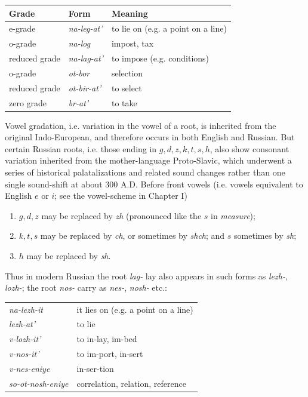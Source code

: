 \begin{center}
\begin{tabular}{@{}lll@{}}
\toprule
Grade & Form & Meaning\\
\midrule
e-grade & \emph{na-leg-at'} & to lie on (e.g. a point on a line)\\
o-grade & \emph{na-log} & impost, tax\\
reduced grade & \emph{na-lag-at'} & to impose (e.g. conditions)\\
o-grade & \emph{ot-bor} & selection\\
reduced grade & \emph{ot-bir-at'} & to select\\
zero grade & \emph{br-at'} & to take\\
\bottomrule
\end{tabular}
\end{center}


Vowel gradation, i.e. variation in the vowel of a root, is inherited from the original Indo-European, and therefore occurs in both English and Russian. But certain Russian roots, i.e. those ending in $g,d,z,k,t,s,h$, also show consonant variation inherited from the mother-language Proto-Slavic, which underwent a series of historical palatalizations and related sound changes rather than one single sound-shift at about 300 A.D. Before front vowels (i.e. vowels equivalent to English $e$ or $i$; see the vowel-scheme in Chapter I)

\begin{enumerate}[label=\roman*)]
\item $g,d,z$ may be replaced by \emph{zh} (pronounced like the $s$ in \emph{measure});
\item $k,t,s$ may be replaced by \emph{ch}, or sometimes by \emph{shch}; and $s$ sometimes by \emph{sh};
\item $h$ may be replaced by \emph{sh}.
\end{enumerate}

Thus in modern Russian the root \emph{lag-} lay also appears in such forms as \emph{lezh-}, \emph{lozh-}; the root \emph{nos-} carry as \emph{nes-}, \emph{nosh-} etc.:

\begin{center}
\begin{tabular}{@{}ll@{}}
\emph{na-lezh-it} & it lies on (e.g. a point on a line)\\
\emph{lezh-at'} & to lie\\
\emph{v-lozh-it'} & to in-lay, im-bed\\
\emph{v-nos-it'} & to im-port, in-sert\\
\emph{v-nes-eniye} & in-ser-tion\\
\emph{so-ot-nosh-eniye} & correlation, relation, reference\\
\end{tabular}
\end{center}

